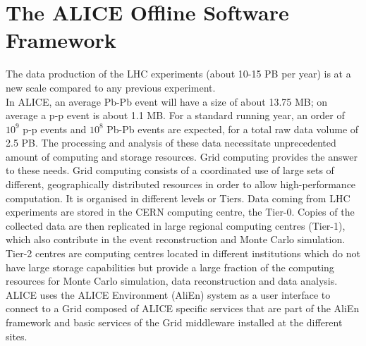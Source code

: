 \section{The ALICE Offline Software Framework}
The data production of the LHC experiments (about 10-15 PB per year) is at a new scale compared to any previous experiment. \\In ALICE, an average Pb-Pb event will have a size of about 13.75 MB; on average a p-p event is about 1.1 MB. For a standard running year, an order of $10^9$ p-p events and $10^8$ Pb-Pb events are expected, for a total raw data volume of 2.5 PB. The processing and analysis of these data necessitate unprecedented amount of computing and storage resources. Grid computing provides the answer to these needs. Grid computing consists of a coordinated use of large sets of different, geographically distributed resources in order to allow high-performance computation. It is organised in different levels or Tiers. Data coming from LHC experiments are stored in the CERN computing centre, the Tier-0. Copies of the collected data are then replicated in large regional computing centres (Tier-1), which also contribute in the event reconstruction and Monte Carlo simulation. Tier-2 centres are computing centres located in different institutions which do not have large storage capabilities but provide a large fraction of the computing resources for Monte Carlo simulation, data reconstruction and data analysis. \\ALICE uses the ALICE Environment (AliEn) system \cite{alien} as a user interface to connect to a Grid composed of ALICE specific services that are part of the AliEn framework and basic services of the Grid middleware installed at the different sites.

